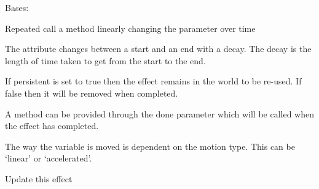 \documentclass[letterpaper,10pt,english]{sphinxmanual}
\begin{document}

\begin{fulllineitems}
\label{blocks:serge.blocks.effects.MethodCallFade}
Bases: {\hyperref[blocks:serge.blocks.effects.Effect]{}}

Repeated call a method linearly changing the parameter over time

The attribute changes between a start and an end with a decay.
The decay is the length of time taken to get from the start to the end.

If persistent is set to true then the effect remains in the world to be
re-used. If false then it will be removed when completed.

A method can be provided through the done parameter which will be called
when the effect has completed.

The way the variable is moved is dependent on the motion type. This can
be `linear' or `accelerated'.

\begin{fulllineitems}
\label{blocks:serge.blocks.effects.MethodCallFade.updateActor}
Update this effect

\end{fulllineitems}


\end{fulllineitems}

\end{document}
